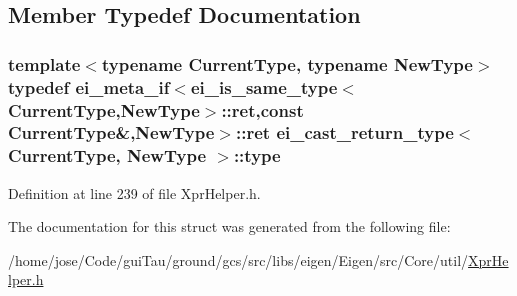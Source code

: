 \subsection{Member Typedef Documentation}
\hypertarget{structei__cast__return__type_aaf527fabe3ef319c8386e44538a6950e}{
\subsubsection[{type}]{\setlength{\rightskip}{0pt plus 5cm}template$<$typename Current\-Type, typename New\-Type$>$ typedef {\bf ei\-\_\-meta\-\_\-if}$<${\bf ei\-\_\-is\-\_\-same\-\_\-type}$<$Current\-Type,New\-Type$>$\-::{\bf ret},const Current\-Type\&,New\-Type$>$\-::{\bf ret} {\bf ei\-\_\-cast\-\_\-return\-\_\-type}$<$ Current\-Type, New\-Type $>$\-::{\bf type}}}\label{structei__cast__return__type_aaf527fabe3ef319c8386e44538a6950e}


Definition at line 239 of file Xpr\-Helper.\-h.



The documentation for this struct was generated from the following file\-:\begin{DoxyCompactItemize}
\item 
/home/jose/\-Code/gui\-Tau/ground/gcs/src/libs/eigen/\-Eigen/src/\-Core/util/\hyperlink{_xpr_helper_8h}{Xpr\-Helper.\-h}\end{DoxyCompactItemize}

